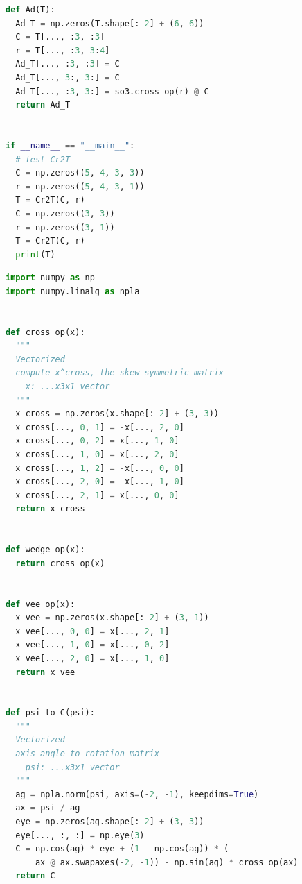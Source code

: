 \documentclass[a4paper]{article}
\begin{document}
\begin{lstlisting}[language=Python, basicstyle=\small, caption=se3.py]
def Ad(T):
  Ad_T = np.zeros(T.shape[:-2] + (6, 6))
  C = T[..., :3, :3]
  r = T[..., :3, 3:4]
  Ad_T[..., :3, :3] = C
  Ad_T[..., 3:, 3:] = C
  Ad_T[..., :3, 3:] = so3.cross_op(r) @ C
  return Ad_T


if __name__ == "__main__":
  # test Cr2T
  C = np.zeros((5, 4, 3, 3))
  r = np.zeros((5, 4, 3, 1))
  T = Cr2T(C, r)
  C = np.zeros((3, 3))
  r = np.zeros((3, 1))
  T = Cr2T(C, r)
  print(T)
\end{lstlisting}

\begin{lstlisting}[language=Python, basicstyle=\small, caption=so3.py]
import numpy as np
import numpy.linalg as npla


def cross_op(x):
  """
  Vectorized
  compute x^cross, the skew symmetric matrix
    x: ...x3x1 vector
  """
  x_cross = np.zeros(x.shape[:-2] + (3, 3))
  x_cross[..., 0, 1] = -x[..., 2, 0]
  x_cross[..., 0, 2] = x[..., 1, 0]
  x_cross[..., 1, 0] = x[..., 2, 0]
  x_cross[..., 1, 2] = -x[..., 0, 0]
  x_cross[..., 2, 0] = -x[..., 1, 0]
  x_cross[..., 2, 1] = x[..., 0, 0]
  return x_cross


def wedge_op(x):
  return cross_op(x)


def vee_op(x):
  x_vee = np.zeros(x.shape[:-2] + (3, 1))
  x_vee[..., 0, 0] = x[..., 2, 1]
  x_vee[..., 1, 0] = x[..., 0, 2]
  x_vee[..., 2, 0] = x[..., 1, 0]
  return x_vee


def psi_to_C(psi):
  """
  Vectorized
  axis angle to rotation matrix
    psi: ...x3x1 vector
  """
  ag = npla.norm(psi, axis=(-2, -1), keepdims=True)
  ax = psi / ag
  eye = np.zeros(ag.shape[:-2] + (3, 3))
  eye[..., :, :] = np.eye(3)
  C = np.cos(ag) * eye + (1 - np.cos(ag)) * (
      ax @ ax.swapaxes(-2, -1)) - np.sin(ag) * cross_op(ax)
  return C
\end{lstlisting}
\end{document}
